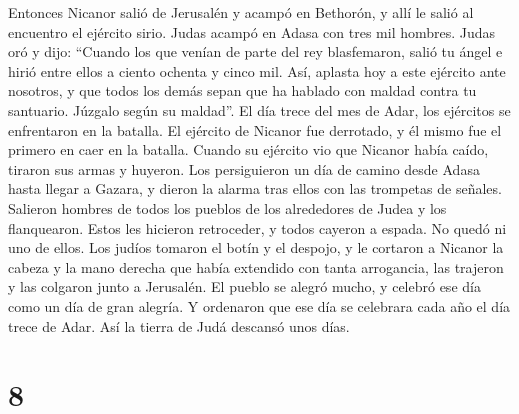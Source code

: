  Entonces Nicanor salió de Jerusalén y acampó en
Bethorón, y allí le salió al encuentro el ejército sirio.
 Judas acampó en Adasa con tres mil hombres. Judas oró y
dijo:  ``Cuando los que venían de parte del rey
blasfemaron, salió tu ángel e hirió entre ellos a ciento ochenta y cinco
mil.  Así, aplasta hoy a este ejército ante nosotros, y
que todos los demás sepan que ha hablado con maldad contra tu santuario.
Júzgalo según su maldad''.  El día trece del mes de Adar,
los ejércitos se enfrentaron en la batalla. El ejército de Nicanor fue
derrotado, y él mismo fue el primero en caer en la batalla.
 Cuando su ejército vio que Nicanor había caído, tiraron
sus armas y huyeron.  Los persiguieron un día de camino
desde Adasa hasta llegar a Gazara, y dieron la alarma tras ellos con las
trompetas de señales.  Salieron hombres de todos los
pueblos de los alrededores de Judea y los flanquearon. Estos les
hicieron retroceder, y todos cayeron a espada. No quedó ni uno de ellos.
 Los judíos tomaron el botín y el despojo, y le cortaron
a Nicanor la cabeza y la mano derecha que había extendido con tanta
arrogancia, las trajeron y las colgaron junto a Jerusalén.
 El pueblo se alegró mucho, y celebró ese día como un día
de gran alegría.  Y ordenaron que ese día se celebrara
cada año el día trece de Adar.  Así la tierra de Judá
descansó unos días.

\hypertarget{section-7}{%
\section{8}\label{section-7}}

